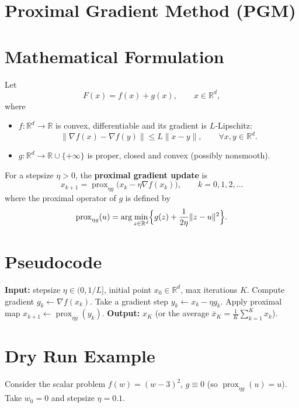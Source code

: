 \documentclass{article}
\newcommand{\prox}{\operatorname{prox}}
\newcommand{\R}{\mathbb{R}}
\begin{document}
\section*{Proximal Gradient Method (PGM)}

\section*{Mathematical Formulation}
Let 
\[
F(x)=f(x)+g(x),\qquad x\in\R^{d},
\]
where  

\begin{itemize}
  \item $f:\R^{d}\rightarrow\R$ is convex, differentiable and its gradient is $L$‑Lipschitz:
        \[
        \|\nabla f(x)-\nabla f(y)\|\le L\|x-y\|,\qquad\forall x,y\in\R^{d}.
        \]
  \item $g:\R^{d}\rightarrow\R\cup\{+\infty\}$ is proper, closed and convex (possibly nonsmooth).  
\end{itemize}
For a stepsize $\eta>0$, the \textbf{proximal gradient update} is
\begin{equation}
\boxed{\;
x_{k+1}= \prox_{\eta g}\bigl(x_{k}-\eta\nabla f(x_{k})\bigr),\qquad k=0,1,2,\dots
\;}
\label{eq:update}
\end{equation}
where the proximal operator of $g$ is defined by
\[
\prox_{\eta g}(u)=\arg\min_{z\in\R^{d}}\Bigl\{g(z)+\frac{1}{2\eta}\|z-u\|^{2}\Bigr\}.
\]

\section*{Pseudocode}
\begin{algorithm}[H]
\caption{Proximal Gradient Method}
\begin{algorithmic}[1]
\STATE \textbf{Input:} stepsize $\eta\in(0,1/L]$, initial point $x_{0}\in\R^{d}$, max iterations $K$.
    \STATE Compute gradient $g_{k}\gets \nabla f(x_{k})$.
    \STATE Take a gradient step $y_{k}\gets x_{k}-\eta g_{k}$.
    \STATE Apply proximal map $x_{k+1}\gets \prox_{\eta g}(y_{k})$.
\ENDFOR
\STATE \textbf{Output:} $x_{K}$ (or the average $\bar x_{K}= \tfrac1K\sum_{k=1}^{K}x_{k}$).
\end{algorithmic}
\end{algorithm}

\section*{Dry Run Example}
Consider the scalar problem $f(w)=(w-3)^{2}$, $g\equiv0$ (so $\prox_{\eta g}(u)=u$).  
Take $w_{0}=0$ and stepsize $\eta=0.1$.
\end{document}
